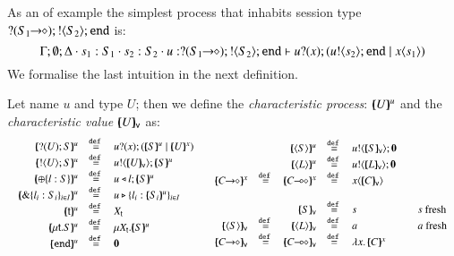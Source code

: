 As an of example the simplest process that inhabits 
session type $? (S_1\!\! \rightarrow\!\! \diamond) ; ! \langle S_2 \rangle ; \mathtt{end}$ 
is:
%
\[
	\Gamma; \emptyset; \Delta \cdot s_1: S_1 \cdot s_2: S_2 \cdot u: ? (S_1\!\! \rightarrow\!\! \diamond) ; ! \langle S_2 \rangle ; \mathtt{end} \vdash u ? (x) ; (u ! \langle s_2 \rangle ; \mathtt{end} \;|\; x\langle s_1 \rangle)
\]
%
\noi 
We formalise the last intuition in the next definition.
%
\begin{definition}\rm
	\label{def:characteristic_process}
	\noi Let name $u$ and type $U$; then we define the {\em characteristic process}:
	$[\!\!(U)\!\!]^{u}$ and the {\em characteristic value} $[\!\!(U)\!\!]_{\mathsf{v}}$ as:
%
	\[
	\begin{array}{cc}
		\begin{array}{rclcl}
			\mapchar{\btinp{U} S}{u} &\defeq& \binp{u}{x} (\mapchar{S}{u} \Par \mapchar{U}{x})
			\\
			\mapchar{\btout{U} S}{u} &\defeq& \bout{u}{\omapchar{U}} \mapchar{S}{u} %
			\\
			\mapchar{\btsel{l : S}}{u} &\defeq& \bsel{u}{l} \mapchar{S}{u}
			\\
			\mapchar{\btbra{l_i: S_i}_{i \in I}}{u} &\defeq& \bbra{u}{l_i: \mapchar{S_i}{u}}_{i \in I}
			\\
			\mapchar{\tvar{t}}{u} &\defeq& \varp{X}_{\vart{t}}
			\\
			\mapchar{\trec{t}{S}}{u} &\defeq& \recp{X_{\vart{t}}}{\mapchar{S}{u}}
			\\
			\mapchar{\tinact}{u} &\defeq& \inact
			\\
		\end{array}
		&
		\begin{array}{rcrclcl}
			&&\mapchar{\chtype{S}}{u} &\defeq& \bout{u}{\omapchar{S}} \inact
			\\
			&&\mapchar{\chtype{L}}{u} &\defeq& \bout{u}{\omapchar{L}} \inact
			\\
			\mapchar{\shot{C}}{x} &\defeq& \mapchar{\lhot{C}}{x} &\defeq& \appl{x}{\omapchar{C}}
			\\
			\\
			&&\omapchar{S} &\defeq& s && s \textrm{ fresh}
			\\
			\omapchar{\chtype{S}} &\defeq& \omapchar{\chtype{L}} &\defeq& a && a \textrm{ fresh}
			\\
			\omapchar{\shot{C}} &\defeq& \omapchar{\lhot{C}} &\defeq& \abs{x}{\mapchar{C}{x}}
		\end{array}
	\end{array}
	\]
\end{definition}
%

